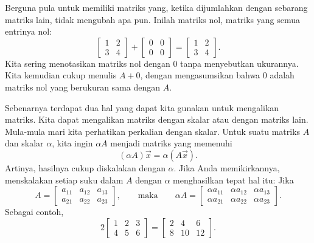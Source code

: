 Berguna pula untuk memiliki matriks yang, ketika dijumlahkan dengan sebarang matriks lain,
tidak mengubah apa pun. Inilah matriks nol, matriks yang semua entrinya nol:
\begin{equation*}
\begin{bmatrix}
1 & 2 \\
3 & 4
\end{bmatrix}
+
\begin{bmatrix}
0 & 0 \\
0 & 0
\end{bmatrix}
=
\begin{bmatrix}
1 & 2 \\
3 & 4
\end{bmatrix} .
\end{equation*}
Kita sering menotasikan matriks nol
dengan $0$ tanpa menyebutkan ukurannya. Kita kemudian cukup menulis $A + 0$, dengan
mengasumsikan bahwa $0$ adalah matriks nol yang berukuran sama dengan $A$.

\medskip

Sebenarnya terdapat dua hal yang dapat kita gunakan untuk mengalikan matriks. Kita dapat mengalikan
matriks dengan skalar atau dengan matriks lain. Mula-mula mari kita
perhatikan perkalian dengan skalar.
Untuk suatu matriks $A$ dan skalar $\alpha$, kita ingin $\alpha A$ menjadi matriks
yang memenuhi
\begin{equation*}
(\alpha A) \vec{x} = \alpha (A \vec{x}) .
\end{equation*}
Artinya, hasilnya cukup diskalakan dengan $\alpha$. Jika Anda memikirkannya,
menskalakan setiap suku dalam $A$ dengan $\alpha$ menghasilkan tepat hal itu:
Jika
\begin{equation*}
A =
\begin{bmatrix}
a_{11} & a_{12} & a_{13}  \\
a_{21} & a_{22} & a_{23}
\end{bmatrix},
\qquad\text{maka} \qquad
\alpha A =
\begin{bmatrix}
\alpha a_{11} & \alpha a_{12} & \alpha a_{13}  \\
\alpha a_{21} & \alpha a_{22} & \alpha a_{23}
\end{bmatrix} .
\end{equation*}
Sebagai contoh,
\begin{equation*}
2
\begin{bmatrix}
1 & 2 & 3 \\
4 & 5 & 6
\end{bmatrix} =
\begin{bmatrix}
2 & 4 & 6 \\
8 & 10 & 12
\end{bmatrix} .
\end{equation*}

